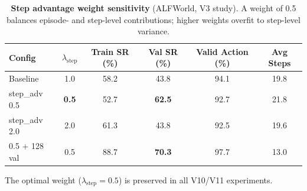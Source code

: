 \begin{table}[h]
  \centering
  \caption{%
    \textbf{Step advantage weight sensitivity} (ALFWorld, V3 study).
    A weight of 0.5 balances episode- and step-level contributions;
    higher weights overfit to step-level variance.
  }
  \label{tab:stepw_sensitivity}
  \vspace{4pt}
  \small
  \renewcommand{\arraystretch}{1.15}
  \begin{tabular}{@{}lccccc@{}}
    \toprule
    \textbf{Config} & $\lambda_{\text{step}}$
      & \textbf{Train SR (\%)} & \textbf{Val SR (\%)}
      & \textbf{Valid Action (\%)} & \textbf{Avg Steps} \\
    \midrule
    Baseline       & 1.0          & 58.2 & 43.8          & 94.1 & 19.8 \\
    step\_adv 0.5  & \textbf{0.5} & 52.7 & \textbf{62.5} & 92.7 & 21.8 \\
    step\_adv 2.0  & 2.0          & 61.3 & 43.8          & 92.5 & 19.6 \\
    0.5 + 128 val  & 0.5          & 88.7 & \textbf{70.3} & 97.7 & 13.0 \\
    \bottomrule
  \end{tabular}
\end{table}

The optimal weight ($\lambda_{\text{step}} = 0.5$) is preserved in all V10/V11
experiments.

